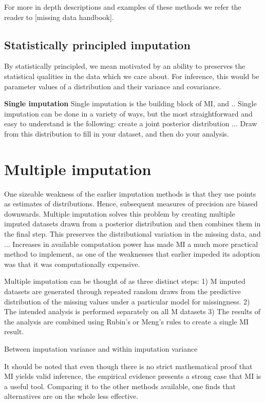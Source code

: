 \documentclass{article}
\begin{document}
	For more in depth descriptions and examples of these methods we refer the reader to [missing data handbook].
	
	\subsection{Statistically principled imputation}
	By statistically principled, we mean motivated by an ability to preserves the statistical qualities in the data which we care about. For inference, this would be parameter values of a distribution and their variance and covariance.
	
	
	\textbf{Single imputation}
	Single imputation is the building block of MI, and .. Single imputation can be done in a variety of ways, but the most straightforward and easy to understand is the following: create a joint posterior distribution ... Draw from this distribution to fill in your dataset, and then do your analysis. 
	
	\section{Multiple imputation}
	One sizeable weakness of the earlier imputation methods is that they use points as estimates of distributions. Hence, subsequent measures of precision are biased downwards. Multiple imputation solves this problem by creating multiple imputed datasets drawn from a posterior distribution and then combines them in the final step. This preserves the distributional variation in the missing data, and ... Increases in available computation power has made MI a much more practical method to implement, as one of the weaknesses that earlier impeded its adoption was that it was computationally expensive. 
	
	Multiple imputation can be thought of as three distinct steps:
	1) M imputed datasets are generated through repeated random draws from the predictive distribution of the missing values under a particular model for missingness.
	2) The intended analysis is performed separately on all M datasets
	3) The results of the analysis are combined using Rubin's or Meng's rules to create a single MI result. 
	
	 
	
	Between imputation variance and within imputation variance
	
	
	It should be noted that even though there is no strict mathematical proof that MI yields valid inference, the empirical evidence presents a strong case that MI is a useful tool. Comparing it to the other methods available, one finds that alternatives are on the whole less effective.
	
\end{document}
